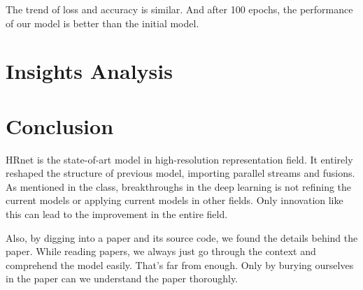 \documentclass[10pt,twocolumn,letterpaper]{article}
\begin{document}
The trend of loss and accuracy is similar.
And after 100 epochs, the performance of our model is better than the initial model.

\section{Insights Analysis}



\section{Conclusion}

HRnet is the state-of-art model in high-resolution representation field.
It entirely reshaped the structure of previous model,
importing parallel streams and fusions.
As mentioned in the class,
breakthroughs in the deep learning is not refining the current models
or applying current models in other fields.
Only innovation like this can lead to the improvement in the entire field.

Also, by digging into a paper and its source code,
we found the details behind the paper.
While reading papers,
we always just go through the context and comprehend the model easily.
That's far from enough.
Only by burying ourselves in the paper can we understand the paper thoroughly.

{\small


}
\end{document}
